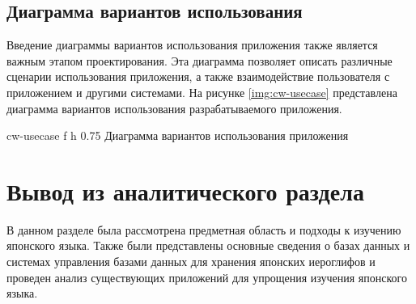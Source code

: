 \subsection{Диаграмма вариантов использования}

Введение диаграммы вариантов использования приложения также 
является важным этапом проектирования. Эта диаграмма позволяет 
описать различные сценарии использования приложения, а также
взаимодействие пользователя с приложением и другими системами.
На рисунке \ref{img:cw-usecase} представлена диаграмма вариантов
использования разрабатываемого приложения.

  {cw-usecase}
  {f}
  {h}
  {0.75\linewidth}
  {Диаграмма вариантов использования приложения}

\clearpage

\section*{Вывод из аналитического раздела}

В данном разделе была рассмотрена предметная область и подходы
к изучению японского языка. Также были представлены основные сведения
о базах данных и системах управления базами данных для хранения
японских иероглифов и проведен анализ существующих приложений
для упрощения изучения японского языка.

